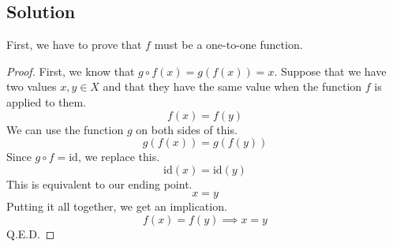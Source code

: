 \documentclass[12pt]{report}
\begin{document}
\subsection*{Solution}
\newcommand{\id}{\text{id}}
First, we have to prove that $f$ must be a one-to-one function.
\begin{proof}
    First, we know that $g \circ f(x) = g(f(x)) = x$. 
    Suppose that we have two values $x, y \in X$ and that they have the same value when the function $f$ is applied to them.
    \begin{equation}
        f(x) = f(y)
    \end{equation} 
    We can use the function $g$ on both sides of this.
    \begin{equation}
        g(f(x)) = g(f(y))
    \end{equation}
    Since $g \circ f = \id$, we replace this.
    \begin{equation}
        \id(x) = \id(y)
    \end{equation}
    This is equivalent to our ending point.
    \begin{equation}
        x = y
    \end{equation}
    Putting it all together, we get an implication.
    \begin{equation}
        f(x) = f(y) \implies x = y
    \end{equation}
    Q.E.D.
\end{proof}
\end{document}
